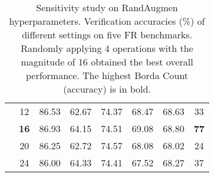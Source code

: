\documentclass[10pt,twocolumn,letterpaper]{ieeeconf}
\begin{document}
\begin{table}[h!]
{\begin{tabular}{|c|c|c|c|c|c|c|c|}
                                                                                              & 12                 & 86.53        & 62.67            & 74.37           & 68.47          & 68.63          & 33                                                              \\
                                                                                              & \textbf{16}                 & 86.93        & 64.15            & 74.51           & 69.08          & 68.80          & \textbf{77}                                                              \\
                                                                                              & 20                 & 86.25        & 62.72            & 74.57           & 68.08          & 68.02          & 24                                                              \\
                                                                                              & 24                 & 86.00        & 64.33            & 74.41           & 67.52          & 68.27          & 37                                                              \\ \hline
\end{tabular}}
\caption{Sensitivity study on RandAugmen hyperparameters. Verification accuracies (\%) of different settings on five FR benchmarks. Randomly applying 4 operations with the magnitude of 16 obtained the best overall performance. The highest Borda Count (accuracy) is in bold.}
\label{tab:RA_hyperparameter}
\vspace{-3mm}
\end{table}
\end{document}

